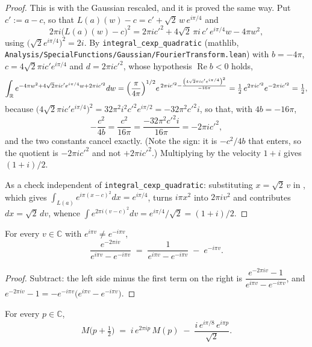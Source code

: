 \begin{proof}
\leanok
{}
This is  with the Gaussian rescaled, and it is proved the same
way.  Put $c':=a-c$, so that $L(a)(w)-c=c'+\sqrt2\,w\,e^{i\pi/4}$ and
\[
  2\pi i\bigl(L(a)(w)-c\bigr)^{2}
   =2\pi ic'^{2}+4\sqrt2\,\pi i\,c'\,e^{i\pi/4}w-4\pi w^{2},
\]
using $\bigl(\sqrt2e^{i\pi/4}\bigr)^{2}=2i$.  By \texttt{integral\_cexp\_quadratic} (mathlib,
\texttt{Analysis/SpecialFunctions/Gaussian/FourierTransform.lean}) with $b=-4\pi$,
$c=4\sqrt2\pi ic'e^{i\pi/4}$ and $d=2\pi ic'^{2}$, whose hypothesis $\operatorname{Re}b<0$ holds,
\[
  \int_{\mathbb{R}}e^{-4\pi w^{2}+4\sqrt2\pi ic'e^{i\pi/4}w+2\pi ic'^{2}}dw
   =\Bigl(\frac{\pi}{4\pi}\Bigr)^{1/2}e^{\,2\pi ic'^{2}-\frac{\left(4\sqrt2\pi ic'e^{i\pi/4}\right)^{2}}{-16\pi}}
   =\tfrac12\,e^{2\pi ic'^{2}}e^{-2\pi ic'^{2}}=\tfrac12 ,
\]
because $\bigl(4\sqrt2\pi ic'e^{i\pi/4}\bigr)^{2}=32\pi^{2}i^{2}c'^{2}e^{i\pi/2}=-32\pi^{2}c'^{2}i$,
so that, with $4b=-16\pi$,
\[
  -\frac{c^{2}}{4b}=\frac{c^{2}}{16\pi}=\frac{-32\pi^{2}c'^{2}i}{16\pi}=-2\pi ic'^{2},
\]
and the two constants cancel exactly.  (Note the sign: it is $-c^{2}/4b$ that enters, so the
quotient is $-2\pi ic'^{2}$ and not $+2\pi ic'^{2}$.)  Multiplying by the velocity $1+i$ gives
$(1+i)/2$.

As a check independent of \texttt{integral\_cexp\_quadratic}: substituting $x=\sqrt2\,v$ in
, which gives $\int_{L(a)}e^{i\pi(x-c)^{2}}dx=e^{i\pi/4}$, turns
$i\pi x^{2}$ into $2\pi iv^{2}$ and contributes $dx=\sqrt2\,dv$, whence
$\int e^{2\pi i(v-c)^{2}}dv=e^{i\pi/4}/\sqrt2=(1+i)/2$.
\end{proof}

\begin{lemma}
\label{lem:rsf_partial}
\leanok
For every $v\in\mathbb{C}$ with $e^{i\pi v}\ne e^{-i\pi v}$,
\[
  \frac{e^{-2\pi iv}}{e^{i\pi v}-e^{-i\pi v}}
  \;=\;\frac{1}{e^{i\pi v}-e^{-i\pi v}}\;-\;e^{-i\pi v} .
\]
\end{lemma}

\begin{proof}
\leanok
Subtract: the left side minus the first term on the right is
$\dfrac{e^{-2\pi iv}-1}{e^{i\pi v}-e^{-i\pi v}}$, and
$e^{-2\pi iv}-1=-e^{-i\pi v}\bigl(e^{i\pi v}-e^{-i\pi v}\bigr)$.
\end{proof}

\begin{lemma}
\label{lem:rsf_half_shift}
\leanok
{}
For every $p\in\mathbb{C}$,
\[
  M\bigl(p+\tfrac12\bigr)\;=\;i\,e^{2\pi ip}\,M(p)\;-\;\frac{i\,e^{i\pi/8}\,e^{i\pi p}}{\sqrt2} .
\]
\end{lemma}

